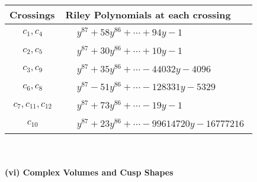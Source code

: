 \documentclass[1p]{elsarticle_modified}
\theoremstyle{definition}
\begin{document}
\begin{tabular}{m{50pt}|m{274pt}}
Crossings & \hspace{64pt}Riley Polynomials at each crossing \\
\hline $$\begin{aligned}c_{1},c_{4}\end{aligned}$$&$\begin{aligned}
&y^{87}+58 y^{86}+\cdots+94 y-1
\end{aligned}$\\
\hline $$\begin{aligned}c_{2},c_{5}\end{aligned}$$&$\begin{aligned}
&y^{87}+30 y^{86}+\cdots+10 y-1
\end{aligned}$\\
\hline $$\begin{aligned}c_{3},c_{9}\end{aligned}$$&$\begin{aligned}
&y^{87}+35 y^{86}+\cdots-44032 y-4096
\end{aligned}$\\
\hline $$\begin{aligned}c_{6},c_{8}\end{aligned}$$&$\begin{aligned}
&y^{87}-51 y^{86}+\cdots-128331 y-5329
\end{aligned}$\\
\hline $$\begin{aligned}c_{7},c_{11},c_{12}\end{aligned}$$&$\begin{aligned}
&y^{87}+73 y^{86}+\cdots-19 y-1
\end{aligned}$\\
\hline $$\begin{aligned}c_{10}\end{aligned}$$&$\begin{aligned}
&y^{87}+23 y^{86}+\cdots-99614720 y-16777216
\end{aligned}$\\
\hline
\end{tabular}\\~\\
\newpage\flushleft \textbf{(vi) Complex Volumes and Cusp Shapes}
\end{document}
